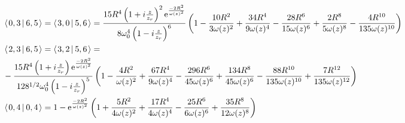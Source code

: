 \documentclass[11pt]{amsart}
\makeatletter
\newcommand{\e}{{\rm e}}				%
\newcommand{\msp}[1]{\mspace{#1mu}}		%
\newcommand{\0}{\varnothing}		%
\newcommand{\brac}[2]{\left\langle\msp{2} #1\left\lvert \msp{3.5} #2 \right.\right\rangle}	%
\newcommand{\1}{!}
\newcommand{\2}{@}
\newcommand{\3}{\#}
\newcommand{\4}{\$}
\newcommand{\5}{\%}
\newcommand{\6}{$^\wedge$}
\newcommand{\7}{\&}
\newcommand{\8}{*}
\newcommand{\9}{(}
\makeatother
\begin{document}
\begin{align*}
\\
&
\brac{0,3}{6,5} = \brac{3,0}{5,6} 
= \frac{15R^4\left(1+i\frac{z}{z_r}\right)^2\e^{\frac{-2R^2}{\omega(z)^2}}}{8\omega_0^4\left(1-i\frac{z}{z_r}\right)^6}\left(1-\frac{10R^2}{3\omega(z)^2}+\frac{34R^4}{9\omega(z)^4}-\frac{28R^6}{15\omega(z)^6}+\frac{2R^8}{5\omega(z)^8}-\frac{4R^{10}}{135\omega(z)^{10}}\right)
\\
&
\brac{2,3}{6,5} = \brac{3,2}{5,6} = \\
&-\frac{15R^4\left(1+i\frac{z}{z_r}\right)\e^{\frac{-2R^2}{\omega(z)^2}}}{128^{1/2}\omega_0^4\left(1-i\frac{z}{z_r}\right)^5}\left(1-\frac{4R^2}{\omega(z)^2}+\frac{67R^4}{9\omega(z)^4}-\frac{296R^6}{45\omega(z)^6}+\frac{134R^8}{45\omega(z)^6}-\frac{88R^{10}}{135\omega(z)^{10}}+\frac{7R^{12}}{135\omega(z)^{12}}\right)
\\
&
\brac{0,4}{0,4} = 1-\e^{\frac{-2R^2}{\omega(z)^2}}\left(1+\frac{5R^2}{4\omega(z)^2}+\frac{17R^4}{4\omega(z)^4}-\frac{25R^6}{6\omega(z)^6}+\frac{35R^8}{12\omega(z)^8}\right)
\end{align*}
\end{document}
